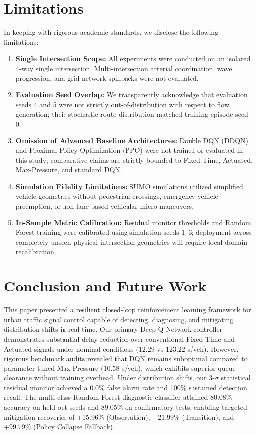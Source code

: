 \documentclass{ieeeaccess}
\begin{document}
\section{Limitations}
\label{sec:limitations}
In keeping with rigorous academic standards, we disclose the following limitations:
\begin{enumerate}
    \item \textbf{Single Intersection Scope:} All experiments were conducted on an isolated 4-way single intersection. Multi-intersection arterial coordination, wave progression, and grid network spillbacks were not evaluated.
    \item \textbf{Evaluation Seed Overlap:} We transparently acknowledge that evaluation seeds 4 and 5 were not strictly out-of-distribution with respect to flow generation; their stochastic route distribution matched training episode seed 0.
    \item \textbf{Omission of Advanced Baseline Architectures:} Double DQN (DDQN) and Proximal Policy Optimization (PPO) were not trained or evaluated in this study; comparative claims are strictly bounded to Fixed-Time, Actuated, Max-Pressure, and standard DQN.
    \item \textbf{Simulation Fidelity Limitations:} SUMO simulations utilized simplified vehicle geometries without pedestrian crossings, emergency vehicle preemption, or non-lane-based vehicular micro-maneuvers.
    \item \textbf{In-Sample Metric Calibration:} Residual monitor thresholds and Random Forest training were calibrated using simulation seeds 1--3; deployment across completely unseen physical intersection geometries will require local domain recalibration.
\end{enumerate}

\section{Conclusion and Future Work}
\label{sec:conclusion}
This paper presented a resilient closed-loop reinforcement learning framework for urban traffic signal control capable of detecting, diagnosing, and mitigating distribution shifts in real time. Our primary Deep Q-Network controller demonstrates substantial delay reduction over conventional Fixed-Time and Actuated signals under nominal conditions ($12.29$ vs $123.22$ s/veh). However, rigorous benchmark audits revealed that DQN remains suboptimal compared to parameter-tuned Max-Pressure ($10.58$ s/veh), which exhibits superior queue clearance without training overhead. Under distribution shifts, our 3-$\sigma$ statistical residual monitor achieved a 0.0\% false alarm rate and 100\% sustained detection recall. The multi-class Random Forest diagnostic classifier attained 80.08\% accuracy on held-out seeds and 89.05\% on confirmatory tests, enabling targeted mitigation recoveries of +15.96\% (Observation), +21.99\% (Transition), and +99.79\% (Policy Collapse Fallback).
\end{document}
